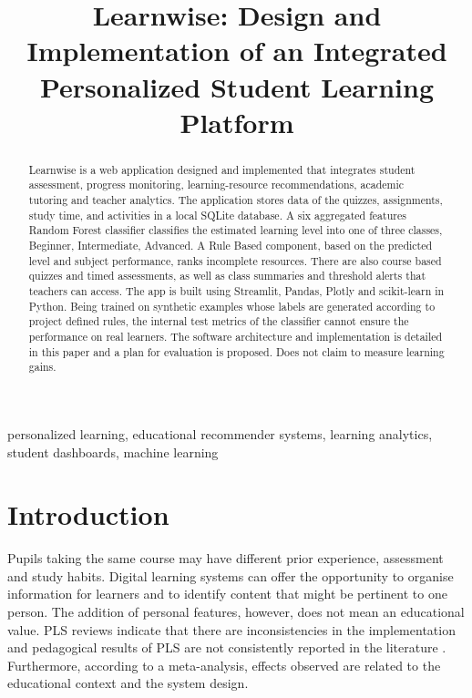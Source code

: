 \documentclass[conference]{IEEEtran}
\title{Learnwise: Design and Implementation of an Integrated Personalized Student Learning Platform}
\author{\IEEEauthorblockN{Jayanth Sri Sai, Vamsee Krishna, Meganadh, and Lohitha}
\IEEEauthorblockA{Department of Computer Science and Engineering\\
Koneru Lakshmaiah Education Foundation (KL University), India}}
\begin{document}
\maketitle

\begin{abstract}
Learnwise is a web application designed and implemented that integrates student assessment, progress monitoring, learning-resource recommendations, academic tutoring and teacher analytics. The application stores data of the quizzes, assignments, study time, and activities in a local SQLite database. A six aggregated features Random Forest classifier classifies the estimated learning level into one of three classes, Beginner, Intermediate, Advanced. A Rule Based component, based on the predicted level and subject performance, ranks incomplete resources. There are also course based quizzes and timed assessments, as well as class summaries and threshold alerts that teachers can access. The app is built using Streamlit, Pandas, Plotly and scikit-learn in Python. Being trained on synthetic examples whose labels are generated according to project defined rules, the internal test metrics of the classifier cannot ensure the performance on real learners. The software architecture and implementation is detailed in this paper and a plan for evaluation is proposed. Does not claim to measure learning gains.
\end{abstract}

\begin{IEEEkeywords}
personalized learning, educational recommender systems, learning analytics, student dashboards, machine learning
\end{IEEEkeywords}

\section{Introduction}
Pupils taking the same course may have different prior experience, assessment and study habits. Digital learning systems can offer the opportunity to organise information for learners and to identify content that might be pertinent to one person. The addition of personal features, however, does not mean an educational value. PLS reviews indicate that there are inconsistencies in the implementation and pedagogical results of PLS are not consistently reported in the literature \cite{zhang2020,dasilva2023}. Furthermore, according to a meta-analysis, effects observed are related to the educational context and the system design.
\end{document}
